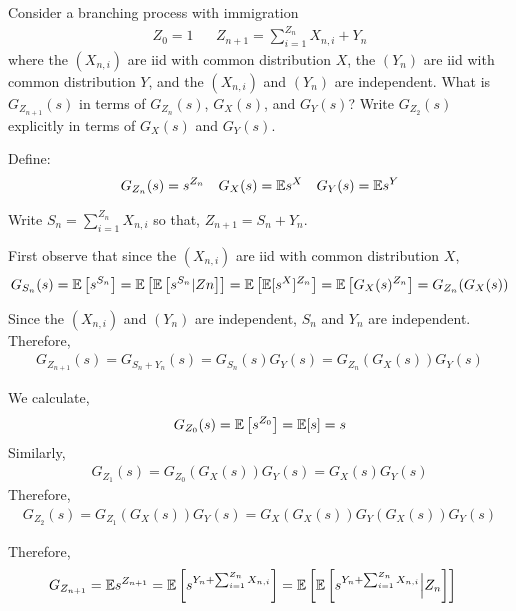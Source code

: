 \begin{problem}[Exercise 3.4]
Consider a branching process with immigration
\begin{align*}
    Z_0=1 && Z_{n+1}=\sum_{i=1}^{Z_n}X_{n,i}+Y_n
\end{align*}
where the \( (X_{n,i}) \) are iid with common distribution \( X \), the \( (Y_n) \) are iid with common distribution \( Y \), and the \( (X_{n,i}) \) and \( (Y_n) \) are independent. What is \( G_{Z_{n+1}}(s) \) in terms of \( G_{Z_n}(s)\), \( G_X(s) \), and \( G_Y(s) \)? Write \( G_{Z_2}(s) \) explicitly in terms of \( G_X(s) \) and \( G_Y(s) \).
\end{problem}

\begin{solution}[Solution]
Define:
\begin{align*}
    G_{Z_n}(s) = s^{Z_n} && G_X(s) = \mathbb{E} s^X && G_Y(s)=\mathbb{E} s^Y 
\end{align*}

Write \( S_n = \sum_{i=1}^{Z_n}X_{n,i} \) so that, \( Z_{n+1}=S_n+Y_n \).


First observe that since the \( (X_{n,i}) \) are iid with common distribution \( X \),
\begin{align*}
    G_{S_n}(s) = \mathbb{E}\left[s^{S_n}\right] = \mathbb{E}\left[\mathbb{E}\left[s^{S_n}|Zn\right]\right] = \mathbb{E} \left[ \mathbb{E}[s^X]^{Z_n} \right] = \mathbb{E} \left[ G_X(s)^{Z_n} \right] = G_{Z_n}(G_X(s))
\end{align*}

Since the \( (X_{n,i}) \) and \( (Y_n) \) are independent, \( S_n \) and \( Y_n \) are independent. Therefore,
\begin{align*}
    G_{Z_{n+1}}(s) = G_{S_n+Y_n}(s) = G_{S_n}(s)G_{Y}(s)  = G_{Z_n}(G_X(s))G_Y(s)
\end{align*}


We calculate, 
\begin{align*}
    G_{Z_0}(s) = \mathbb{E}\left[s^{Z_0}\right] = \mathbb{E}[s] = s
\end{align*}
Similarly,
\begin{align*}
    G_{Z_1}(s) = G_{Z_0}(G_X(s))G_Y(s) = G_X(s)G_Y(s) 
\end{align*}
Therefore,
\begin{align*}
    G_{Z_2}(s) = G_{Z_1}(G_X(s))G_Y(s) = G_X(G_X(s))G_Y(G_X(s))G_Y(s)
\end{align*}

\iffalse
Therefore,
\begin{align*}
    G_{Z_{n+1}} &= \mathbb{E} s^{Z_{n+1}} 
    = \mathbb{E} \left[s^{Y_n+\sum_{i=1}^{Z_n}X_{n,i}} \right]
    = \mathbb{E}\left[\mathbb{E} \left[s^{Y_n+\sum_{i=1}^{Z_n}X_{n,i}} \Big| Z_n \right]\right]
\end{align*}


\end{solution}
